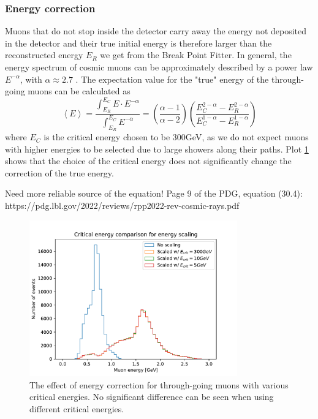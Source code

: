 \documentclass[12pt]{article}
\begin{document}
\subsubsection{Energy correction}
Muons that do not stop inside the detector carry away the energy not deposited in the detector and their true initial energy is therefore larger than the reconstructed energy $E_R$ we get from the Break Point Fitter. In general, the energy spectrum of cosmic muons can be approximately described by a power law $E^{-\alpha}$, with $\alpha\approx2.7$ \cite{NOVA-doc-51327-v3}. The expectation value for the "true" energy of the through-going muons can be calculated as
\begin{equation}
\left\langle E\right\rangle =\frac{\int^{E_C}_{E_R} E\cdot E^{-\alpha}}{\int^{E_C}_{E_R} E^{-\alpha}}=\left(\frac{\alpha -1}{\alpha -2}\right)\left(\frac{E_C^{2-\alpha}-E_R^{2-\alpha}}{E_C^{1-\alpha}-E_R^{1-\alpha}}\right)
\end{equation}
where $E_C$ is the critical energy chosen to be 300GeV, as we do not expect muons with higher energies to be selected due to large showers along their paths. Plot \ref{figEnergyScaling} shows that the choice of the critical energy does not significantly change the correction of the true energy.

Need more reliable source of the equation!
Page 9 of the PDG, equation (30.4):
https://pdg.lbl.gov/2022/reviews/rpp2022-rev-cosmic-rays.pdf

\begin{figure}[hbtp]
\centering
\includegraphics[width=0.8\textwidth]{ECritComparison.pdf}
\caption{The effect of energy correction for through-going muons with various critical energies. No significant difference can be seen when using different critical energies.}
\label{figEnergyScaling}
\end{figure}
\end{document}

